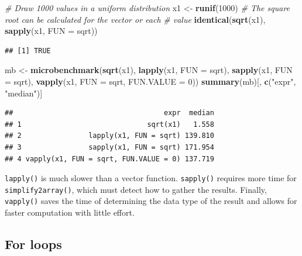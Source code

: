 \documentclass[
  12pt,
  american,
  a4paper,
  extrafontsizes,onecolumn,openright
  ]{memoir}
\newenvironment{Shaded}{\begin{snugshade}}{\end{snugshade}}
\newcommand{\AttributeTok}[1]{\textcolor[rgb]{0.13,0.29,0.53}{#1}}
\newcommand{\CommentTok}[1]{\textcolor[rgb]{0.56,0.35,0.01}{\textit{#1}}}
\newcommand{\DecValTok}[1]{\textcolor[rgb]{0.00,0.00,0.81}{#1}}
\newcommand{\FunctionTok}[1]{\textcolor[rgb]{0.13,0.29,0.53}{\textbf{#1}}}
\newcommand{\NormalTok}[1]{#1}
\newcommand{\OtherTok}[1]{\textcolor[rgb]{0.56,0.35,0.01}{#1}}
\newcommand{\StringTok}[1]{\textcolor[rgb]{0.31,0.60,0.02}{#1}}
\begin{document}
\begin{Shaded}
\begin{Highlighting}[]
\CommentTok{\# Draw 1000 values in a uniform distribution}
\NormalTok{x1 }\OtherTok{\textless{}{-}} \FunctionTok{runif}\NormalTok{(}\DecValTok{1000}\NormalTok{)}
\CommentTok{\# The square root can be calculated for the vector or each}
\CommentTok{\# value}
\FunctionTok{identical}\NormalTok{(}\FunctionTok{sqrt}\NormalTok{(x1), }\FunctionTok{sapply}\NormalTok{(x1, }\AttributeTok{FUN =}\NormalTok{ sqrt))}
\end{Highlighting}
\end{Shaded}

\begin{verbatim}
## [1] TRUE
\end{verbatim}

\begin{Shaded}
\begin{Highlighting}[]
\NormalTok{mb }\OtherTok{\textless{}{-}} \FunctionTok{microbenchmark}\NormalTok{(}\FunctionTok{sqrt}\NormalTok{(x1), }\FunctionTok{lapply}\NormalTok{(x1, }\AttributeTok{FUN =}\NormalTok{ sqrt), }\FunctionTok{sapply}\NormalTok{(x1,}
    \AttributeTok{FUN =}\NormalTok{ sqrt), }\FunctionTok{vapply}\NormalTok{(x1, }\AttributeTok{FUN =}\NormalTok{ sqrt, }\AttributeTok{FUN.VALUE =} \DecValTok{0}\NormalTok{))}
\FunctionTok{summary}\NormalTok{(mb)[, }\FunctionTok{c}\NormalTok{(}\StringTok{"expr"}\NormalTok{, }\StringTok{"median"}\NormalTok{)]}
\end{Highlighting}
\end{Shaded}

\begin{verbatim}
##                                    expr  median
## 1                              sqrt(x1)   1.558
## 2                lapply(x1, FUN = sqrt) 139.810
## 3                sapply(x1, FUN = sqrt) 171.954
## 4 vapply(x1, FUN = sqrt, FUN.VALUE = 0) 137.719
\end{verbatim}

\normalsize

\texttt{lapply()} is much slower than a vector function.
\texttt{sapply()} requires more time for \texttt{simplify2array()}, which must detect how to gather the results.
Finally, \texttt{vapply()} saves the time of determining the data type of the result and allows for faster computation with little effort.

\subsection{For loops}\label{for-loops}
\end{document}
